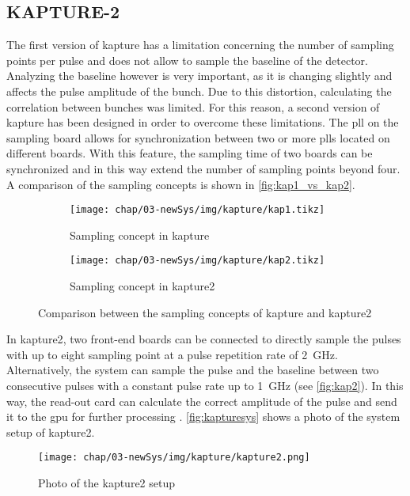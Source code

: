 \subsection{KAPTURE-2}
The first version of \gls{kapture} has a limitation concerning the number of sampling points per pulse and does not allow to sample the baseline of the detector.
Analyzing the baseline however is very important, as it is changing slightly and affects the pulse amplitude of the bunch. 
Due to this distortion, calculating the correlation between bunches was limited. 
For this reason, a second version of \gls{kapture} has been designed in order to overcome these limitations. 
The \gls{pll} on the sampling board allows for synchronization between two or more \glspl{pll} located on different boards.
With this feature, the sampling time of two boards can be synchronized and in this way extend the number of sampling points beyond four.
A comparison of the sampling concepts is shown in \autoref{fig:kap1_vs_kap2}.
\begin{figure}[H]
	\centering
	\begin{subfigure}{0.48\textwidth}
		\centering
		\texttt{[image: chap/03-newSys/img/kapture/kap1.tikz]}  
		\caption{Sampling concept in \gls{kapture}}
		\label{fig:kap1}
	\end{subfigure}
	\hfill
	\begin{subfigure}{0.48\textwidth}
		\centering
		\texttt{[image: chap/03-newSys/img/kapture/kap2.tikz]}  
		\caption{Sampling concept in \gls{kapture2}}
		\label{fig:kap2}
	\end{subfigure}
	\caption[Comparison between KAPTURE and KAPTURE-2]{Comparison between the sampling concepts of \gls{kapture} and \gls{kapture2}}
	\label{fig:kap1_vs_kap2}
\end{figure}
In \gls{kapture2}, two front-end boards can be connected to directly sample the pulses with up to eight sampling point at a pulse repetition rate of \SI{2}{\GHz}. 
Alternatively, the system can sample the pulse and the baseline between two consecutive pulses with a constant pulse rate up to \SI{1}{\GHz} (see \autoref{fig:kap2}).
In this way, the read-out card can calculate the correct amplitude of the pulse and send it to the \gls{gpu} for further processing \cite{caselleKAP}.
\autoref{fig:kapturesys} shows a photo of the system setup of \gls{kapture2}.
\begin{figure}[H]
	\centering
	\texttt{[image: chap/03-newSys/img/kapture/kapture2.png]}
	\caption[Photo of KAPTURE v2 system]{Photo of the \gls{kapture2} setup}
	\label{fig:kapturesys}
\end{figure}
\clearpage

